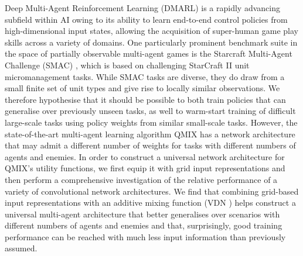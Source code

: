 Deep Multi-Agent Reinforcement Learning (DMARL) is a rapidly advancing subfield within AI owing to its ability to learn end-to-end control policies from high-dimensional input states, allowing the acquisition of super-human game play skills across a variety of domains. One particularly prominent benchmark suite in the space of partially observable multi-agent games is the Starcraft Multi-Agent Challenge (SMAC) \cite{smac}, which is based on challenging StarCraft II unit micromanagement tasks. 
While SMAC tasks are diverse, they do draw from a small finite set of unit types and give rise to locally similar observations. We therefore hypothesise that it should be possible to both train policies that can generalise over previously unseen tasks, as well to warm-start training of difficult large-scale tasks using policy weights from similar small-scale tasks.
However, the state-of-the-art multi-agent learning algorithm QMIX \cite{qmixcite} has a network architecture that may admit a different number of weights for tasks with different numbers of agents and enemies.  
In order to construct a universal network architecture for QMIX's utility functions, we first equip it with grid input representations and then perform a comprehensive investigation of the relative performance of a variety of convolutional network architectures. We find that combining grid-based input representations with an additive mixing function (VDN \cite{vdn}) helps construct a universal multi-agent architecture that better generalises over scenarios with different numbers of agents and enemies and that, surprisingly, good training performance can be reached with much less input information than previously assumed.